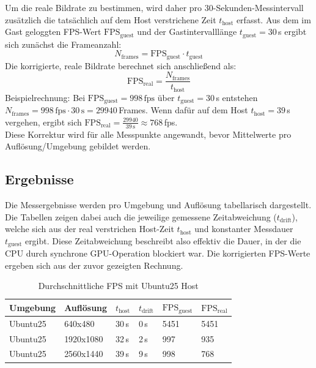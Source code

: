 Um die reale Bildrate zu bestimmen, wird daher pro 30-Sekunden-Messintervall zusätzlich die tatsächlich auf dem Host verstrichene Zeit $t_{\mathrm{host}}$ erfasst. Aus dem im Gast geloggten FPS-Wert $\mathrm{FPS}_{\mathrm{guest}}$ und der Gastintervalllänge $t_{\mathrm{guest}} = 30$\,s ergibt sich zunächst die Frameanzahl:
\[
N_{\mathrm{frames}} = \mathrm{FPS}_{\mathrm{guest}} \cdot t_{\mathrm{guest}}
\]
Die korrigierte, reale Bildrate berechnet sich anschließend als:
\[
\mathrm{FPS}_{\mathrm{real}} = \frac{N_{\mathrm{frames}}}{t_{\mathrm{host}}}
\]
Beispielrechnung: Bei $\mathrm{FPS}_{\mathrm{guest}} = 998$\,$\mathrm{fps}$ über $t_{\mathrm{guest}} = 30$\,s entstehen $N_{\mathrm{frames}} = 998\,\mathrm{fps} \cdot 30\,\mathrm{s} = 29940$\,Frames. Wenn dafür auf dem Host $t_{\mathrm{host}} = 39$\,s vergehen, ergibt sich $\mathrm{FPS}_{\mathrm{real}} = \frac{29940}{39\,\mathrm{s}} \approx 768$\,fps.\\

Diese Korrektur wird für alle Messpunkte angewandt, bevor Mittelwerte pro Auflösung/Umgebung gebildet werden.

\clearpage

\subsection{Ergebnisse}

Die Messergebnisse werden pro Umgebung und Auflösung tabellarisch dargestellt. Die Tabellen zeigen dabei auch die jeweilige gemessene Zeitabweichung ($t_{\mathrm{drift}}$), welche sich aus der real verstrichen Host-Zeit $t_{\mathrm{host}}$ und konstanter Messdauer $t_{\mathrm{guest}}$ ergibt. Diese Zeitabweichung beschreibt also effektiv die Dauer, in der die CPU durch synchrone GPU-Operation blockiert war. Die korrigierten FPS-Werte ergeben sich aus der zuvor gezeigten Rechnung.

\begin{table}[H]
\begin{center}
    \begin{tabular}{| l | l | l | l | l | l |}
    \hline
    Umgebung & Auflösung & $t_{\mathrm{host}}$ & $t_{\mathrm{drift}}$ & $\mathrm{FPS}_{\mathrm{guest}}$ & $\mathrm{FPS}_{\mathrm{real}}$ \\ \hline
    Ubuntu25 & 640x480 & 30\,s & 0\,s & 5451 & 5451 \\ \hline
    Ubuntu25 & 1920x1080 & 32\,s & 2\,s & 997 & 935 \\ \hline
    Ubuntu25 & 2560x1440 & 39\,s & 9\,s & 998 & 768 \\ \hline
    \end{tabular}
\end{center}
\caption{Durchschnittliche FPS mit Ubuntu25 Host}
\label{tabelle_avarage_time}
\end{table}

